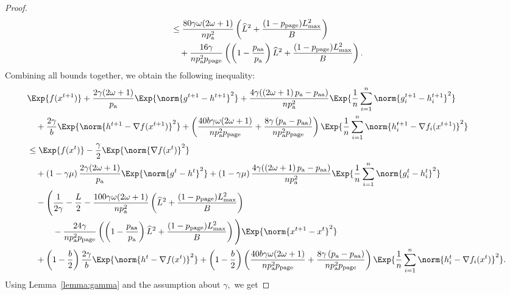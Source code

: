 \documentclass{article}
\newcommand*{\probavailable}{\ensuremath{p_{\textnormal{a}}}}
\newcommand*{\probpairaa}{\ensuremath{p_{\textnormal{aa}}}}
\newcommand*{\probpage}{\ensuremath{p_{\text{page}}}}
\begin{document}
\begin{proof}
\begin{align*}
      &\leq \frac{80 \gamma \omega (2 \omega + 1)}{n \probavailable^2} \left(\widehat{L}^2 + \frac{(1 - \probpage)L_{\max}^2}{B}\right) \\
      &\quad + \frac{16 \gamma}{n \probavailable^2 \probpage} \left(\left(1 - \frac{\probpairaa}{\probavailable}\right)\widehat{L}^2 + \frac{(1 - \probpage)L_{\max}^2}{B}\right).
    \end{align*}
    Combining all bounds together, we obtain the following inequality:
    \begin{align*}
      &\Exp{f(x^{t + 1})} + \frac{2\gamma (2 \omega + 1)}{\probavailable} \Exp{\norm{g^{t+1} - h^{t+1}}^2} + \frac{4 \gamma (\left(2 \omega + 1\right)\probavailable - \probpairaa)}{n \probavailable^2} \Exp{\frac{1}{n}\sum_{i=1}^n\norm{g^{t+1}_i - h^{t+1}_i}^2}\\
      &\quad  + \frac{2\gamma}{b} \Exp{\norm{h^{t+1} - \nabla f(x^{t+1})}^2} + \left(\frac{40 b \gamma \omega (2 \omega + 1)}{n \probavailable^2 \probpage} + \frac{8 \gamma \left(\probavailable - \probpairaa\right)}{n \probavailable^2 \probpage}\right) \Exp{\frac{1}{n}\sum_{i=1}^n\norm{h^{t+1}_i - \nabla f_i(x^{t+1})}^2}\\
      &\leq \Exp{f(x^t)} - \frac{\gamma}{2}\Exp{\norm{\nabla f(x^t)}^2} \\
      &\quad + \left(1 - \gamma \mu\right)\frac{2 \gamma (2 \omega + 1)}{\probavailable} \Exp{\norm{g^{t} - h^{t}}^2} + \left(1 - \gamma \mu\right)\frac{4 \gamma (\left(2 \omega + 1\right)\probavailable - \probpairaa)}{n \probavailable^2} \Exp{\frac{1}{n}\sum_{i=1}^n\norm{g^{t}_i - h^{t}_i}^2} \\
      &\quad - \Bigg(\frac{1}{2\gamma} - \frac{L}{2} - \frac{100 \gamma \omega (2 \omega + 1)}{n \probavailable^2} \left(\widehat{L}^2 + \frac{(1 - \probpage)L_{\max}^2}{B}\right) \\
      &\qquad\quad - \frac{24 \gamma}{n \probavailable^2 \probpage}\left(\left(1 - \frac{\probpairaa}{\probavailable}\right) \widehat{L}^2 + \frac{(1 - \probpage)L_{\max}^2}{B}\right)\Bigg) \Exp{\norm{x^{t+1} - x^t}^2} \\
      &\quad + \left(1 - \frac{b}{2}\right)\frac{2\gamma}{b}\Exp{\norm{h^{t} - \nabla f(x^{t})}^2} + \left(1 - \frac{b}{2}\right)\left(\frac{40 b \gamma \omega (2 \omega + 1)}{n \probavailable^2 \probpage} + \frac{8 \gamma \left(\probavailable - \probpairaa\right)}{n \probavailable^2 \probpage}\right)\Exp{\frac{1}{n}\sum_{i=1}^n\norm{h^{t}_i - \nabla f_i(x^{t})}^2}.
    \end{align*}
    Using Lemma~\ref{lemma:gamma} and the assumption about $\gamma,$ we get

\end{proof}
\end{document}
